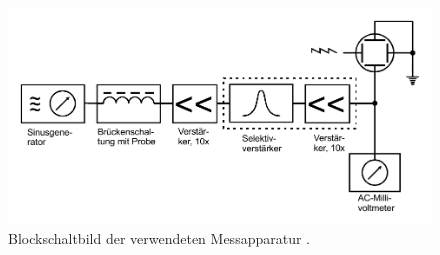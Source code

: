 \begin{figure}
    \centering
    \includegraphics[width=0.8\linewidth]{pictures/Zeichnung4.pdf}
    \caption{Blockschaltbild der verwendeten Messapparatur \cite{v606}.}
    \label{fig:Zeichnung4}
\end{figure}